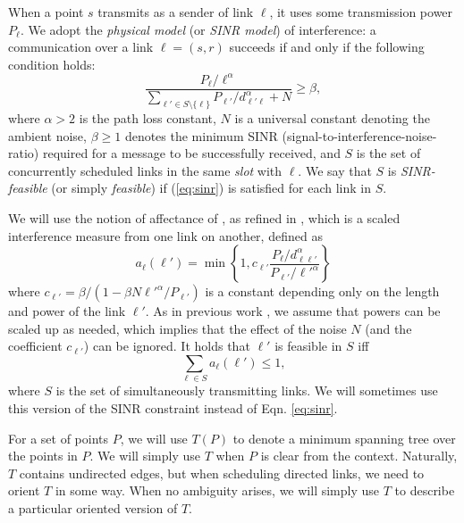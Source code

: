 \documentclass[11pt]{amsart}
\begin{document}
When a point $s$ transmits as a sender of link $\ell$, it uses some transmission power $P_{\ell}$.
We adopt the \emph{physical model} (or \emph{SINR model})
of interference: a communication over a link $\ell = (s, r)$ succeeds if and only if the
following condition holds:
\begin{equation}
 \frac{P_{\ell}/\ell^\alpha}{\sum_{\ell' \in S \setminus  \{\ell\}}
   P_{\ell'}/d_{\ell' \ell}^\alpha + N} \ge \beta, 
 \label{eq:sinr}
\end{equation}
where $\alpha > 2$ is the path loss constant, $N$ is a universal constant denoting the ambient noise, $\beta \ge 1$ denotes the minimum
SINR (signal-to-interference-noise-ratio) required for a message to be successfully received,
and $S$ is the set of concurrently scheduled links in the same \emph{slot} with $\ell$.
We say that $S$ is \emph{SINR-feasible} (or simply \emph{feasible}) if (\ref{eq:sinr}) is
satisfied for each link in $S$. 

We will use the notion of affectance of \cite{HW09}, as refined in \cite{KV10}, 
which is a scaled interference measure from one link on another, defined as 
  \[ a_{\ell}(\ell') 
     = \min\left\{1, c_{\ell'} \frac{P_{\ell}/d_{\ell \ell'}^\alpha}{P_{\ell'}/\ell'^\alpha}\right\}
  \] 
where $c_{\ell'} = \beta/(1 - \beta N {\ell'}^\alpha/P_{\ell'})$ is a constant
depending only on the length and power of the link $\ell'$. 
As in previous work \cite{MoWa06,moscibroda06b,Moscibroda07,KesselheimSoda11}, we assume that
powers can be scaled up as needed, which implies that the effect of the noise $N$ (and the coefficient $c_{\ell'}$) can be ignored.
It holds that $\ell'$ is feasible in $S$ iff
\begin{equation}
\sum_{\ell \in S} a_{\ell}(\ell') \leq 1, 
\end{equation}
where $S$ is the set of simultaneously transmitting links. We will
sometimes use this version of the SINR constraint instead of Eqn. \ref{eq:sinr}.


For a set of points $P$, we will use $T(P)$ to denote a minimum spanning tree over the points in $P$.
We will simply use $T$ when $P$ is clear from the context. Naturally, $T$ contains undirected edges,
but when scheduling directed links, we need to orient $T$ in some way. When no ambiguity
arises, we will simply use $T$ to describe a particular oriented version of $T$.
\end{document}
